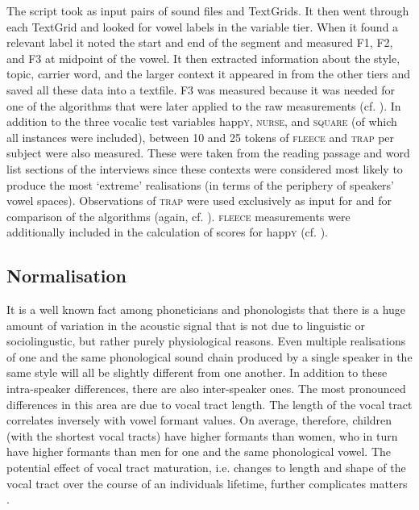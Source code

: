 The script took as input pairs of sound files and TextGrids.
It then went through each TextGrid and looked for vowel labels in the variable tier.
When it found a relevant label it noted the start and end of the segment and measured F1, F2, and F3 at midpoint of the vowel.
It then extracted information about the style, topic, carrier word, and the larger context it appeared in from the other tiers and saved all these data into a textfile.
F3 was measured because it was needed for one of the  algorithms that were later applied to the raw measurements (cf. ).
In addition to the three vocalic test variables happ\textsc{y}, \textsc{nurse}, and \textsc{square} (of which all instances were included), between 10 and 25 tokens of \textsc{fleece} and \textsc{trap} per subject were also measured.
These were taken from the reading passage and word list sections of the interviews since these contexts were considered most likely to produce the most `extreme' realisations (in terms of the periphery of speakers' vowel spaces).
Observations of \textsc{trap} were used exclusively as input for  and for comparison of the algorithms (again, cf. ).
\textsc{fleece} measurements were additionally included in the calculation of  scores for happ\textsc{y} (cf. ).

\subsection{Normalisation}\label{sec.prod_method.norm}

It is a well known fact among phoneticians and phonologists that there is a huge amount of variation in the acoustic signal that is not due to linguistic or sociolingustic, but rather purely physiological reasons.
Even multiple realisations of one and the same phonological sound chain produced by a single speaker in the same style will all be slightly different from one another.
In addition to these intra-speaker differences, there are also inter-speaker ones.
The most pronounced differences in this area are due to vocal tract length.
The length of the vocal tract correlates inversely with vowel formant values.
On average, therefore, children (with the shortest vocal tracts) have higher formants than women, who in turn have higher formants than men for one and the same phonological vowel.
The potential effect of vocal tract maturation, i.e. changes to length and shape of the vocal tract over the course of an individuals lifetime, further complicates matters \parencite[cf.][440--441]{harrington2006}.


